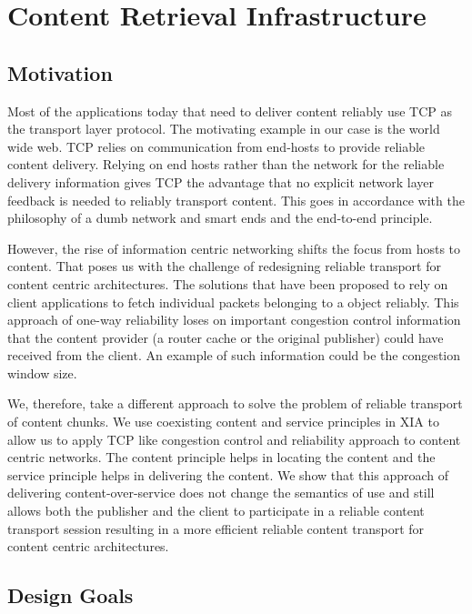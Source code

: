 \chapter{Content Retrieval Infrastructure}
\label{content_retrieval}

\section{Motivation}

Most of the applications today that need to deliver content reliably
use TCP as the transport layer protocol. The motivating example in our
case is the world wide web. TCP relies on communication from end-hosts
to provide reliable content delivery. Relying on end hosts rather than
the network for the reliable delivery information gives TCP the
advantage that no explicit network layer feedback is needed to
reliably transport content. This goes in accordance with the
philosophy of a dumb network and smart ends and the end-to-end
principle.

However, the rise of information centric networking shifts the focus
from hosts to content. That poses us with the challenge of redesigning
reliable transport for content centric architectures. The solutions
that have been proposed to rely on client applications to fetch
individual packets belonging to a object reliably. This approach of
one-way reliability loses on important congestion control information
that the content provider (a router cache or the original publisher)
could have received from the client. An example of such information
could be the congestion window size.

We, therefore, take a different approach to solve the problem of
reliable transport of content chunks. We use coexisting content and
service principles in XIA to allow us to apply TCP like congestion
control and reliability approach to content centric networks. The
content principle helps in locating the content and the service
principle helps in delivering the content. We show that this approach
of delivering content-over-service does not change the semantics of
use and still allows both the publisher and the client to
participate in a reliable content transport session resulting in a
more efficient reliable content transport for content centric
architectures.

\section{Design Goals}

